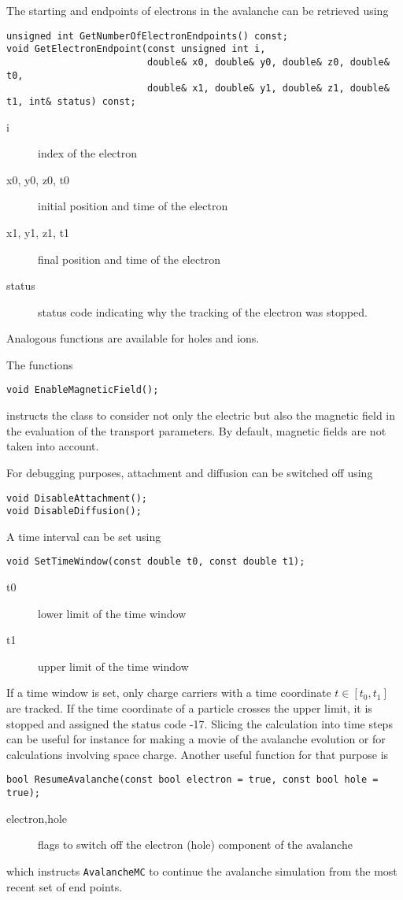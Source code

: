 The starting and endpoints of electrons in the avalanche can be 
retrieved using
\begin{lstlisting}
unsigned int GetNumberOfElectronEndpoints() const;
void GetElectronEndpoint(const unsigned int i, 
                         double& x0, double& y0, double& z0, double& t0,
                         double& x1, double& y1, double& z1, double& t1, int& status) const;
\end{lstlisting}
\begin{description}
  \item[i] index of the electron
  \item[x0, y0, z0, t0] initial position and time of the electron
  \item[x1, y1, z1, t1] final position and time of the electron
  \item[status] status code indicating why the tracking of the electron was stopped.  
\end{description}
Analogous functions are available for holes and ions.

The functions
\begin{lstlisting}
void EnableMagneticField();
\end{lstlisting}
instructs the class to consider not only the electric but also the magnetic field
in the evaluation of the transport parameters.  
By default, magnetic fields are not taken into account.

For debugging purposes, attachment and diffusion can be switched off using
\begin{lstlisting}
void DisableAttachment();
void DisableDiffusion();
\end{lstlisting}

A time interval can be set using
\begin{lstlisting}
void SetTimeWindow(const double t0, const double t1);
\end{lstlisting}
\begin{description}
  \item[t0] lower limit of the time window
  \item[t1] upper limit of the time window 
\end{description}
If a time window is set, 
only charge carriers with a time coordinate \(t \in \left[t_{0}, t_{1}\right]\) 
are tracked. If the time coordinate of a particle crosses the upper limit, 
it is stopped and assigned the status code -17.
Slicing the calculation into time steps can be useful for instance 
for making a movie of the avalanche evolution 
or for calculations involving space charge. 
Another useful function for that purpose is
\begin{lstlisting}
bool ResumeAvalanche(const bool electron = true, const bool hole = true);
\end{lstlisting}
\begin{description}
  \item[electron,hole] flags to switch off the electron (hole) component of the avalanche
\end{description}
which instructs \texttt{AvalancheMC} to continue the avalanche simulation 
from the most recent set of end points. 

